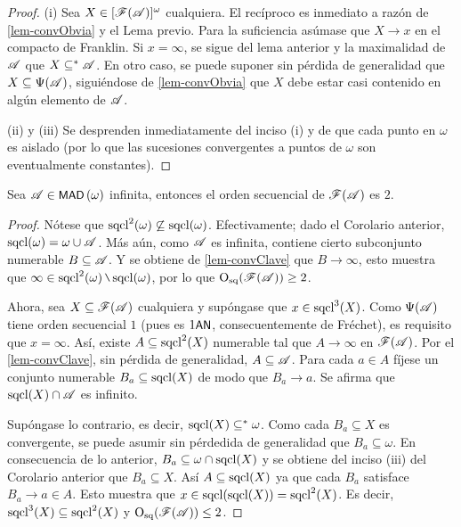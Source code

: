 	\begin{proof} 
		(i) Sea $X \in [\mathscr{F}(\mathscr{A})]^\omega$ cualquiera. El recíproco es inmediato a razón de \ref{lem-convObvia} y el Lema previo. Para la suficiencia asúmase que $X \to x$ en el compacto de Franklin. Si $x = \infty$, se sigue del lema anterior y la maximalidad de $\mathscr{A}$ que $X \subseteq^* \mathscr{A}$. En otro caso, se puede suponer sin pérdida de generalidad que $X \subseteq \Psi(\mathscr{A})$, siguiéndose de \ref{lem-convObvia} que $X$ debe estar casi contenido en algún elemento de $\mathscr{A}$.

		(ii) y (iii) Se desprenden inmediatamente del inciso (i) y de que cada punto en $\omega$ es aislado (por lo que las sucesiones convergentes a puntos de $\omega$ son eventualmente constantes).
	\end{proof} 

	\begin{corolario}
		Sea $\mathscr{A} \in \operatorname{\text{\textsf{\small MAD}}}\,(\omega)$ infinita, entonces el orden secuencial de $\mathscr{F}(\mathscr{A})$ es $2$.
	\end{corolario}

	\begin{proof} 
		Nótese que $\operatorname{sqcl}^2(\omega) \not\subseteq \operatorname{sqcl}(\omega)$. Efectivamente; dado el Corolario anterior, $\operatorname{sqcl}(\omega) = \omega \cup \mathscr{A}$. Más aún, como $\mathscr{A}$ es infinita, contiene cierto subconjunto numerable $B \subseteq \mathscr{A}$. Y se obtiene de \ref{lem-convClave} que $B \to \infty$, esto muestra que $\infty \in \scl^2(\omega) \setminus \scl(\omega)$, por lo que $\operatorname{O_{sq}}(\mathscr{F}(\mathscr{A})) \geq 2$.

		Ahora, sea $X \subseteq \mathscr{F}(\mathscr{A})$ cualquiera y supóngase que $x \in \operatorname{sqcl}^3(X)$. Como $\Psi(\mathscr{A})$ tiene orden secuencial $1$ (pues es $1\text{\textsf{\small AN}}$, consecuentemente de Fréchet), es requisito que $x=\infty$. Así, existe $A \subseteq \operatorname{sqcl}^2(X)$ numerable tal que $A \to \infty$ en $\mathscr{F}(\mathscr{A})$. Por el \autoref{lem-convClave}, sin pérdida de generalidad, $A \subseteq \mathscr{A}$. Para cada $a \in A$ fíjese un conjunto numerable $B_a \subseteq \operatorname{sqcl}(X)$ de modo que $B_a \to a$. Se afirma que $\operatorname{sqcl}(X) \cap \mathscr{A}$ es infinito.

		Supóngase lo contrario, es decir, $\operatorname{sqcl}(X) \subseteq^* \omega$. Como cada $B_a \subseteq X$ es convergente, se puede asumir sin pérdedida de generalidad que $B_a \subseteq \omega$. En consecuencia de lo anterior, $B_a \subseteq \omega \cap \operatorname{sqcl}(X)$ y se obtiene del inciso (iii) del Corolario anterior que $B_a \subseteq X$. Así $A \subseteq \operatorname{sqcl}(X)$ ya que cada $B_a$ satisface $B_a \to a \in A$. Esto muestra que $x \in \operatorname{sqcl}(\operatorname{sqcl}(X))=\operatorname{sqcl}^2(X)$. Es decir, $\operatorname{sqcl}^3(X) \subseteq \operatorname{sqcl}^2(X)$ y $\operatorname{O_{sq}}(\mathscr{F}(\mathscr{A})) \leq 2$.
	\end{proof}

